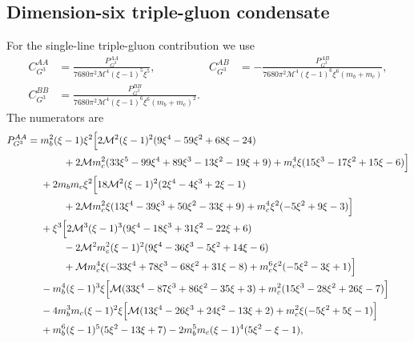 \subsection{Dimension-six triple-gluon condensate}

\begingroup
\small

For the single-line triple-gluon contribution we use
\begin{align}
  C^{AA}_{G^3} &=
  \frac{P^{AA}_{G^3}}{7680\pi^2\mathcal M^4(\xi-1)^5\xi^5},
  &
  C^{AB}_{G^3} &=
  -\frac{P^{AB}_{G^3}}
  {7680\pi^2\mathcal M^4(\xi-1)^6\xi^6(m_b+m_c)}, \nonumber\\
  C^{BB}_{G^3} &=
  \frac{P^{BB}_{G^3}}
  {7680\pi^2\mathcal M^4(\xi-1)^6\xi^6(m_b+m_c)^2}.
\end{align}
The numerators are
\begin{align}
P^{AA}_{G^3}={}&
m_b^2(\xi-1)\xi^2\Big[
2\mathcal M^2(\xi-1)^2(9\xi^4-59\xi^2+68\xi-24) \nonumber\\
&\hspace{0.8cm}
+2\mathcal M m_c^2(33\xi^5-99\xi^4+89\xi^3-13\xi^2-19\xi+9)
+m_c^4\xi(15\xi^3-17\xi^2+15\xi-6)\Big] \nonumber\\
&+2m_bm_c\xi^2\Big[
18\mathcal M^2(\xi-1)^2(2\xi^4-4\xi^3+2\xi-1) \nonumber\\
&\hspace{0.8cm}
+2\mathcal M m_c^2\xi(13\xi^4-39\xi^3+50\xi^2-33\xi+9)
+m_c^4\xi^2(-5\xi^2+9\xi-3)\Big] \nonumber\\
&+\xi^3\Big[
2\mathcal M^3(\xi-1)^3(9\xi^4-18\xi^3+31\xi^2-22\xi+6) \nonumber\\
&\hspace{0.8cm}
-2\mathcal M^2m_c^2(\xi-1)^2(9\xi^4-36\xi^3-5\xi^2+14\xi-6) \nonumber\\
&\hspace{0.8cm}
+\mathcal M m_c^4\xi(-33\xi^4+78\xi^3-68\xi^2+31\xi-8)
+m_c^6\xi^2(-5\xi^2-3\xi+1)\Big] \nonumber\\
&-m_b^4(\xi-1)^3\xi
\Big[\mathcal M(33\xi^4-87\xi^3+86\xi^2-35\xi+3)
+m_c^2(15\xi^3-28\xi^2+26\xi-7)\Big] \nonumber\\
&-4m_b^3m_c(\xi-1)^2\xi
\Big[\mathcal M(13\xi^4-26\xi^3+24\xi^2-13\xi+2)
+m_c^2\xi(-5\xi^2+5\xi-1)\Big] \nonumber\\
&+m_b^6(\xi-1)^5(5\xi^2-13\xi+7)
-2m_b^5m_c(\xi-1)^4(5\xi^2-\xi-1),
\end{align}
